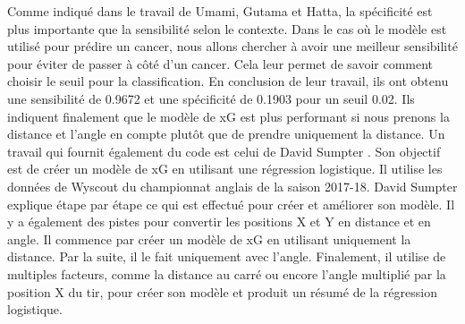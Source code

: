 \documentclass[12pt]{article}
\begin{document}
Comme indiqué dans le travail de Umami, Gutama et Hatta, la spécificité est plus importante que la sensibilité selon le contexte.
Dans le cas où le modèle est utilisé pour prédire un cancer, nous allons chercher à avoir une meilleur sensibilité pour éviter de passer à côté d'un cancer. \cite{umamiImplementingExpectedGoal2021}
Cela leur permet de savoir comment choisir le seuil pour la classification.
En conclusion de leur travail, ils ont obtenu une sensibilité de 0.9672 et une spécificité de 0.1903 pour un seuil 0.02.
Ils indiquent finalement que le modèle de xG est plus performant si nous prenons la distance et l'angle en compte plutôt que de prendre uniquement la distance.
\newline\newline
Un travail qui fournit également du code est celui de David Sumpter \cite{sumpterFittingXGModel}. 
Son objectif est de créer un modèle de xG en utilisant une régression logistique. 
Il utilise les données de Wyscout du championnat anglais de la saison 2017-18. 
David Sumpter explique étape par étape ce qui est effectué pour créer et améliorer son modèle.
Il y a également des pistes pour convertir les positions X et Y en distance et en angle.
Il commence par créer un modèle de xG en utilisant uniquement la distance. 
Par la suite, il le fait uniquement avec l'angle.
Finalement, il utilise de multiples facteurs, comme la distance au carré ou encore l'angle multiplié par la position X du tir, pour créer son modèle et produit un résumé de la régression logistique.
\end{document}
